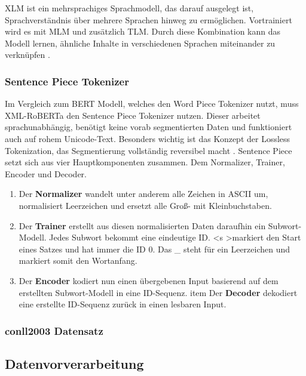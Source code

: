 XLM ist ein mehrsprachiges Sprachmodell, das darauf ausgelegt ist, Sprachverständnis über mehrere Sprachen hinweg zu ermöglichen.
Vortrainiert wird es mit MLM und zusätzlich TLM.
Durch diese Kombination kann das Modell lernen, ähnliche Inhalte in verschiedenen Sprachen miteinander zu verknüpfen \cite{NEURIPS2019_c04c19c2}.

\subsubsection{Sentence Piece Tokenizer} \label{subsec:sentencepiece}

Im Vergleich zum BERT Modell, welches den Word Piece Tokenizer nutzt, muss XML-RoBERTa den Sentence Piece Tokenizer nutzen. Dieser arbeitet sprachunabhängig, benötigt
keine vorab segmentierten Daten und funktioniert auch auf rohem Unicode-Text. 
Besonders wichtig ist das Konzept der Lossless Tokenization, das Segmentierung vollständig reversibel macht \cite{kudo-richardson-2018-sentencepiece}.
Sentence Piece setzt sich aus vier Hauptkomponenten zusammen. Dem Normalizer, Trainer, Encoder und Decoder. 

\begin{enumerate}
    \item Der \textbf{Normalizer} wandelt unter anderem alle Zeichen in ASCII um, normalisiert Leerzeichen und ersetzt alle Groß- mit Kleinbuchstaben.
    \item Der \textbf{Trainer} erstellt aus diesen normalisierten Daten daraufhin ein Subwort-Modell. Jedes Subwort bekommt eine eindeutige ID.
    \textless s \textgreater markiert den Start eines Satzes und hat immer die ID 0. Das \_ steht für ein Leerzeichen und markiert somit den Wortanfang.
    \item Der \textbf{Encoder} kodiert nun einen übergebenen Input basierend auf dem erstellten Subwort-Modell in eine ID-Sequenz.
    item Der \textbf{Decoder} dekodiert eine erstellte ID-Sequenz zurück in einen lesbaren Input.
\end{enumerate}

\subsubsection{conll2003 Datensatz}


\subsection{Datenvorverarbeitung}


